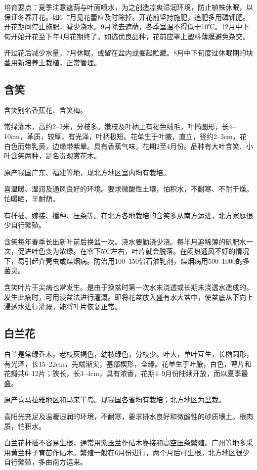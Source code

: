 \documentclass{ctexbook}
\begin{document}
培育要点：夏季注意遮荫与叶面喷水，为之创造凉爽湿润环境，防止植株休眠，以保证冬春开花。如6--7月见花蕾应及时除掉。开花前坚持施肥，追肥多用磷钾肥。开花期间停止施肥，减少浇水。9月除去遮荫，冬季室温不得低于10℃。12月中下旬开始开花至下年4月花期终了。如选优良品种，花前应罩上塑料薄膜避免杂交。

开过花后减少水量，7月休眠，或留在盆内或掘起贮藏。8月中下旬度过休眠期的块茎用新培养土栽植，正常管理。
\subsection{含笑}
含笑别名香蕉花、含笑梅。

常绿灌木，高约2--3米，分枝多。嫩枝及叶柄上有褐色绒毛，叶椭圆形，长4--10cm，革质，较厚，有光泽，叶柄极短。花单生于叶腋，直立，径约2--3cm，花白色而带乳黄，边缘带紫晕。具有香蕉气味，花期2至4月份。品种有大叶含笑、小叶含笑两种，是名贵观赏花木。

原产我国广东、福建等地，现北方地区室内均有栽培。

喜温暖、湿润及通风良好的环境。要求微酸性土壤，怕积水，不耐寒、不耐干燥。怕曝晒，半耐荫。

有扦插、嫁接、播种、压条等。在北方各地栽培的含笑多从南方运进，北方家庭很少自行繁殖。

含笑每年春季长出新叶前后换盆一次。浇水要勤浇少浇。每半月追稀薄的矾肥水一次，促进叶色变为浓绿。在零下5℃左右，叶片就会脱落。在闷热通风不好的情况下，易引起介壳虫或煤烟病。防治用100--150倍石油乳剂，煤烟病用500--1000的多菌灵。

含笑叶片干尖病也常发生。是由于换盆时第一次水未浇透或长期未浇透水造成的。发生此病时，可用浸盆法进行灌溉。即将花盆放入盛有水大盆中，使盆底从下向上浸透水进行灌溉，能将叶片恢复正常。
\subsection{白兰花}
白兰是常绿乔木，老枝灰褐色，幼枝绿色，分枝少。叶大，单叶互生，长椭圆形，有光泽，长15--22cm，先端渐尖，基部楔形，全缘。花单生于叶腋，白色，萼片和花瓣共6--12片；狭长，长3--4cm，具有浓香，花期4--9月份陆续开放，而以夏季最盛。

原产喜马拉雅地区和马来半岛。现我国各省均有栽培；北方地区为盆栽。

喜阳光充足及温暖湿润的环境，不耐寒，要求排水良好和微酸性的砂质壤土。根肉质，怕积水。

白兰花杆插不容易生根，通常用紫玉兰作砧木靠接和高空压条繁殖。广州等地多采用黄兰种子育苗作砧木。繁殖一般在6月份进行，两个月后可生根。北方地区很少自行繁殖，多由南方运来。
\end{document}
